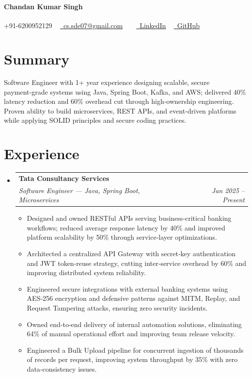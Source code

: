\documentclass[10pt, letterpaper]{article}
\makeatletter
\newcommand{\resumeItem}[1]{
  \item\small{
    {#1 \vspace{-2pt}}
  }
}
\newcommand{\resumeSubheading}[4]{
  \vspace{-2pt}\item
    \begin{tabular*}{1.0\textwidth}[t]{l@{\extracolsep{\fill}}r}
      \textbf{#1} & \textbf{\small #2} \\
      \textit{\small#3} & \textit{\small #4} \\
    \end{tabular*}\vspace{-7pt}
}
\newcommand{\resumeSubHeadingListStart}{\begin{itemize}[leftmargin=0.0in, label={}]}
\newcommand{\resumeSubHeadingListEnd}{\end{itemize}}
\newcommand{\resumeItemListStart}{\begin{itemize}[leftmargin=0.15in]}
\newcommand{\resumeItemListEnd}{\end{itemize}\vspace{-5pt}}
\makeatother
\begin{document}
\begin{center}
    {\Huge \bfseries Chandan Kumar Singh} \\ \vspace{5pt}
    ~ \\ \vspace{5pt}
    \small \faPhone* +91-6200952129 ~ 
    \href{mailto:cs.sde07@gmail.com}{\faEnvelope~cs.sde07@gmail.com} ~ 
     ~ \href{LinkedIn}{\faLinkedin~LinkedIn}
     ~ \href{GitHub}{\faGithub~GitHub}
    
\end{center}

\section{Summary}
Software Engineer with 1+ year experience designing scalable, secure payment‑grade systems using Java, Spring Boot, Kafka, and AWS; delivered 40\% latency reduction and 60\% overhead cut through high‑ownership engineering. Proven ability to build microservices, REST APIs, and event‑driven platforms while applying SOLID principles and secure coding practices.


\section{Experience}
\resumeSubHeadingListStart
  \resumeSubheading{Tata Consultancy Services}{}{Software Engineer — Java, Spring Boot, Microservices}{Jan 2025 -- Present}
    \resumeItemListStart
      \resumeItem{Designed and owned RESTful APIs serving business‑critical banking workflows; reduced average response latency by 40\% and improved platform scalability by 50\% through service‑layer optimizations.}
      \resumeItem{Architected a centralized API Gateway with secret‑key authentication and JWT token‑reuse strategy, cutting inter‑service overhead by 60\% and improving distributed system reliability.}
      \resumeItem{Engineered secure integrations with external banking systems using AES‑256 encryption and defensive patterns against MITM, Replay, and Request Tampering attacks, ensuring zero security incidents.}
      \resumeItem{Owned end‑to‑end delivery of internal automation solutions, eliminating 64\% of manual operational effort and improving team release velocity.}
      \resumeItem{Engineered a Bulk Upload pipeline for concurrent ingestion of thousands of records per request, improving system throughput by 35\% with zero data‑consistency issues.}
    \resumeItemListEnd
\resumeSubHeadingListEnd
\end{document}
